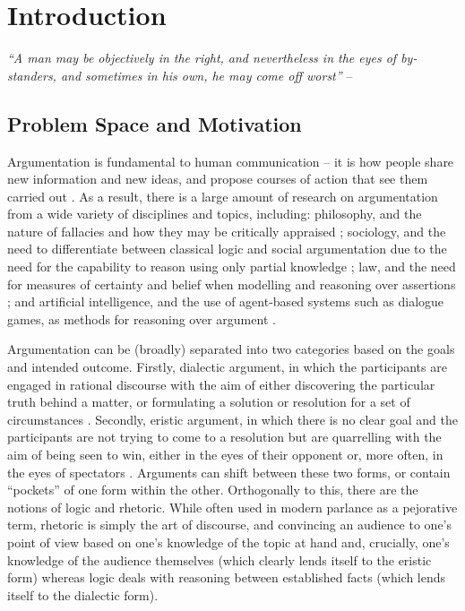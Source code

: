 

\chapter{Introduction}
\label{introduction}

\textit{``A man may be objectively in the right, and nevertheless in the eyes of by-standers, and sometimes in his own, he may come off worst''} -- \citeauthor[The Art of Always Being Right]{Schopenhauer2009}

\section{Problem Space and Motivation}
\label{introduction:problemspace}

Argumentation is fundamental to human communication -- it is how people share new information and new ideas, and propose courses of action that see them carried out \citep{hahn2005circular, Moor2006}. As a result, there is a large amount of research on argumentation from a wide variety of disciplines and topics, including: philosophy, and the nature of fallacies and how they may be critically appraised \citep{tindale2007}; sociology, and the need to differentiate between classical logic and social argumentation due to the need for the capability to reason using only partial knowledge \citep{polos2002reasoning}; law, and the need for measures of certainty and belief when modelling and reasoning over assertions \citep{bertea2004certainty}; and artificial intelligence, and the use of agent-based systems such as dialogue games, as methods for reasoning over argument \citep{bench2007argumentation, karunatillake2008}.

Argumentation can be (broadly) separated into two categories based on the goals and intended outcome. Firstly, dialectic argument, in which the participants are engaged in rational discourse with the aim of either discovering the particular truth behind a matter, or formulating a solution or resolution for a set of circumstances \citep{kerferd1981}. Secondly, eristic argument, in which there is no clear goal and the participants are not trying to come to a resolution but are quarrelling with the aim of being seen to win, either in the eyes of their opponent or, more often, in the eyes of spectators \citep{kerferd1981, Jorgensen1998}. Arguments can shift between these two forms, or contain ``pockets'' of one form within the other. Orthogonally to this, there are the notions of logic and rhetoric. While often used in modern parlance as a pejorative term, rhetoric is simply the art of discourse, and convincing an audience to one's point of view based on one's knowledge of the topic at hand and, crucially, one's knowledge of the audience themselves (which clearly lends itself to the eristic form) whereas logic deals with reasoning between established facts (which lends itself to the dialectic form).

